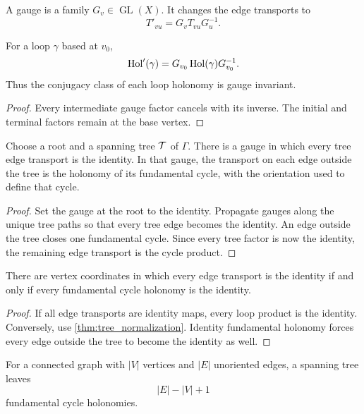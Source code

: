 \begin{definition}\label{def:gauge_change}
A gauge is a family $G_v\in\operatorname{GL}(X)$.  It changes the edge transports to
\[
T'_{vu}=G_vT_{vu}G_u^{-1}.
\]
\end{definition}

\begin{proposition}\label{prop:gauge_covariance}
For a loop $\gamma$ based at $v_0$,
\[
\operatorname{Hol}'(\gamma)
=
G_{v_0}\operatorname{Hol}(\gamma)G_{v_0}^{-1}.
\]
Thus the conjugacy class of each loop holonomy is gauge invariant.
\end{proposition}

\begin{proof}
Every intermediate gauge factor cancels with its inverse.  The initial and terminal factors remain at the base vertex.
\end{proof}

\begin{theorem}\label{thm:tree_normalization}
Choose a root and a spanning tree $\mathcal T$ of $\Gamma$.  There is a gauge in which every tree edge transport is the identity.  In that gauge, the transport on each edge outside the tree is the holonomy of its fundamental cycle, with the orientation used to define that cycle.
\end{theorem}

\begin{proof}
Set the gauge at the root to the identity.  Propagate gauges along the unique tree paths so that every tree edge becomes the identity.  An edge outside the tree closes one fundamental cycle.  Since every tree factor is now the identity, the remaining edge transport is the cycle product.
\end{proof}

\begin{theorem}\label{thm:cycle_gluing}
There are vertex coordinates in which every edge transport is the identity if and only if every fundamental cycle holonomy is the identity.
\end{theorem}

\begin{proof}
If all edge transports are identity maps, every loop product is the identity.  Conversely, use \cref{thm:tree_normalization}.  Identity fundamental holonomy forces every edge outside the tree to become the identity as well.
\end{proof}

\begin{corollary}\label{cor:cycle_number}
For a connected graph with $|V|$ vertices and $|E|$ unoriented edges, a spanning tree leaves
\[
|E|-|V|+1
\]
fundamental cycle holonomies.
\end{corollary}

